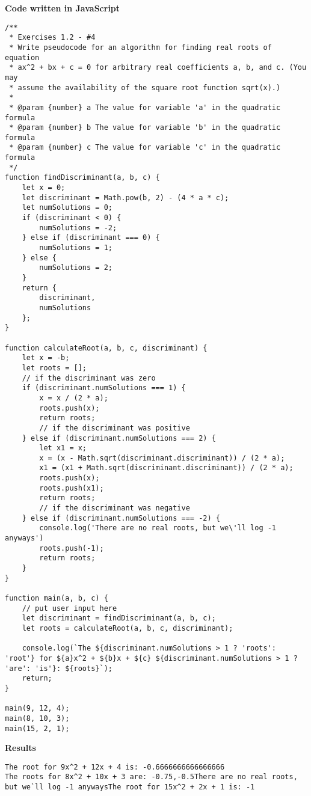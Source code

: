 \documentclass[paper=a4, fontsize=11pt]{scrartcl} %
\numberwithin{equation}{section} %
\numberwithin{figure}{section} %
\numberwithin{table}{section} %
\begin{document}
\bigskip
\textbf{Code written in JavaScript}
\begin{lstlisting}
/**
 * Exercises 1.2 - #4
 * Write pseudocode for an algorithm for finding real roots of equation 
 * ax^2 + bx + c = 0 for arbitrary real coefficients a, b, and c. (You may 
 * assume the availability of the square root function sqrt(x).)
 * 
 * @param {number} a The value for variable 'a' in the quadratic formula 
 * @param {number} b The value for variable 'b' in the quadratic formula 
 * @param {number} c The value for variable 'c' in the quadratic formula 
 */
function findDiscriminant(a, b, c) {
    let x = 0;
    let discriminant = Math.pow(b, 2) - (4 * a * c);
    let numSolutions = 0;
    if (discriminant < 0) {
        numSolutions = -2;
    } else if (discriminant === 0) {
        numSolutions = 1;
    } else {
        numSolutions = 2;
    }
    return { 
        discriminant, 
        numSolutions
    };
}

function calculateRoot(a, b, c, discriminant) {
    let x = -b;
    let roots = [];
    // if the discriminant was zero
    if (discriminant.numSolutions === 1) {
        x = x / (2 * a);
        roots.push(x);
        return roots;
        // if the discriminant was positive
    } else if (discriminant.numSolutions === 2) {
        let x1 = x;
        x = (x - Math.sqrt(discriminant.discriminant)) / (2 * a);
        x1 = (x1 + Math.sqrt(discriminant.discriminant)) / (2 * a);
        roots.push(x);
        roots.push(x1);
        return roots;
        // if the discriminant was negative
    } else if (discriminant.numSolutions === -2) {
        console.log('There are no real roots, but we\'ll log -1 anyways')
        roots.push(-1);
        return roots;
    }
}

function main(a, b, c) {
    // put user input here
    let discriminant = findDiscriminant(a, b, c);
    let roots = calculateRoot(a, b, c, discriminant);
    
    console.log(`The ${discriminant.numSolutions > 1 ? 'roots': 'root'} for ${a}x^2 + ${b}x + ${c} ${discriminant.numSolutions > 1 ? 'are': 'is'}: ${roots}`);
    return;
}

main(9, 12, 4);
main(8, 10, 3);
main(15, 2, 1);
\end{lstlisting}

\bigskip
\textbf{Results}
\begin{lstlisting}
The root for 9x^2 + 12x + 4 is: -0.6666666666666666
The roots for 8x^2 + 10x + 3 are: -0.75,-0.5There are no real roots, but we`ll log -1 anywaysThe root for 15x^2 + 2x + 1 is: -1
\end{lstlisting}
\end{document}
